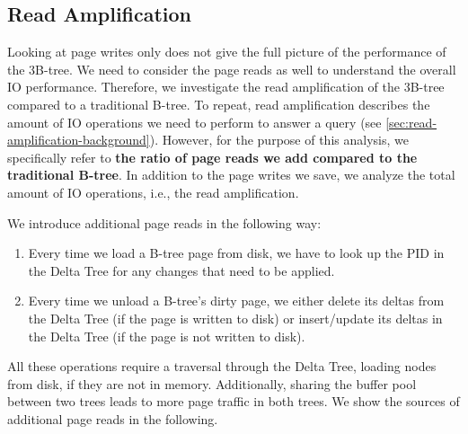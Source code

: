 \subsection{Read Amplification}
\label{sec:read-amplification}
Looking at page writes only does not give the full picture of the performance of the 3B-tree.
We need to consider the page reads as well to understand the overall \ac{IO} performance.
Therefore, we investigate the read amplification of the 3B-tree compared to a traditional B-tree.
To repeat, read amplification describes the amount of \ac{IO} operations we need to perform to answer a query (see \autoref{sec:read-amplification-background}).
However, for the purpose of this analysis, we specifically refer to \textbf{the ratio of page reads we add compared to the traditional B-tree}.
In addition to the page writes we save, we analyze the total amount of \ac{IO} operations, i.e., the read amplification.

We introduce additional page reads in the following way:
\begin{enumerate}
  \item Every time we load a B-tree page from disk, we have to look up the \ac{PID} in the Delta Tree for any changes that need to be applied.
  \item Every time we unload a B-tree's dirty page, we either delete its deltas from the Delta Tree (if the page is written to disk) or insert/update its deltas in the Delta Tree (if the page is not written to disk).
\end{enumerate}
All these operations require a traversal through the Delta Tree, loading nodes from disk, if they are not in memory.
Additionally, sharing the buffer pool between two trees leads to more page traffic in both trees.
We show the sources of additional page reads in the following.


